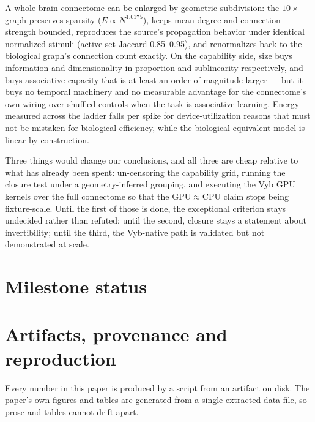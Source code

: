 \documentclass[11pt,a4paper]{article}
\begin{document}
A whole-brain connectome can be enlarged by geometric subdivision: the $10\times$ graph preserves
sparsity ($E \propto N^{1.0175}$), keeps mean degree and connection strength bounded, reproduces
the source's propagation behavior under identical normalized stimuli (active-set Jaccard
0.85--0.95), and renormalizes back to the biological graph's connection count exactly. On the
capability side, size buys information and dimensionality in proportion and sublinearity
respectively, and buys associative capacity that is at least an order of magnitude larger --- but
it buys no temporal machinery and no measurable advantage for the connectome's own wiring over
shuffled controls when the task is associative learning. Energy measured across the ladder falls
per spike for device-utilization reasons that must not be mistaken for biological efficiency,
while the biological-equivalent model is linear by construction.

Three things would change our conclusions, and all three are cheap relative to what has already
been spent: un-censoring the capability grid, running the closure test under a geometry-inferred
grouping, and executing the Vyb GPU kernels over the full connectome so that the GPU$\approx$CPU
claim stops being fixture-scale. Until the first of those is done, the exceptional criterion stays
undecided rather than refuted; until the second, closure stays a statement about invertibility;
until the third, the Vyb-native path is validated but not demonstrated at scale.

\appendix

\section{Milestone status}
\begin{table}[h]
\centering
\caption{Milestone status against the project brief's milestone table, with the evidence that
decides each row. ``Gated'' means deliberately not attempted; the reason is recorded in the
evidence column.}
\label{tab:milestones}

\end{table}

\clearpage
\section{Artifacts, provenance and reproduction}
\label{app:artifacts}
Every number in this paper is produced by a script from an artifact on disk. The paper's own
figures and tables are generated from a single extracted data file, so prose and tables cannot
drift apart.
\end{document}
